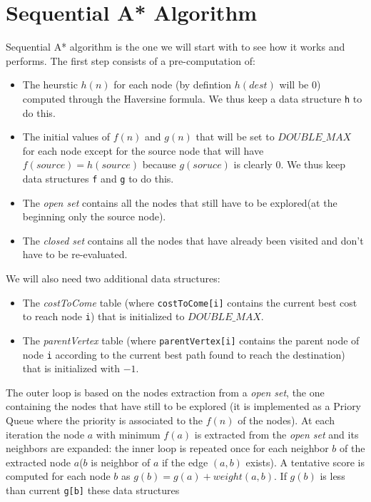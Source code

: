 \documentclass[twocolumn, switch]{article} %
\begin{document}
\section{Sequential A* Algorithm}
Sequential A* algorithm is the one we will start with to see how it works and performs.
The first step consists of a pre-computation of:
\begin{itemize}
  \item The heurstic $h(n)$ for each node (by defintion $h(dest)$ will
        be 0) computed through the Haversine formula. We thus keep a data
        structure \texttt{h} to do this.
  \item The initial values of $f(n)$ and $g(n)$ that will be set to $DOUBLE\_MAX$ for each
        node except for the source node that will have $f(source) = h(source)$ because 
        $g(soruce)$ is clearly $0$. We thus keep data structures \texttt{f} and \texttt{g} to do this.
  \item The \textit{open set} contains all the nodes that still have to be explored(at
        the beginning only the source node).
  \item The \textit{closed set} contains all the nodes that have already been visited and don't
        have to be re-evaluated.
\end{itemize}
We will also need two additional data structures:
\begin{itemize}
  \item The \textit{costToCome} table (where \texttt{costToCome[i]} contains the current
        best cost to reach node \texttt{i}) that is initialized
        to $DOUBLE\_MAX$.
  \item The \textit{parentVertex} table (where \texttt{parentVertex[i]} contains the
        parent node of node \texttt{i} according to the current best path found to reach
        the destination) that is initialized with $-1$.
\end{itemize}
The outer loop is based on the nodes extraction from a \textit{open set}, the one containing
the nodes that have still to be explored (it is implemented as a Priory Queue where the priority
is associated to the $f(n)$ of the nodes). At each iteration the node $a$ with minimum $f(a)$ is
extracted from the \textit{open set} and its neighbors are expanded: the inner loop is repeated once for each neighbor $b$ of the
extracted node $a$($b$ is neighbor of $a$ if the edge $(a, b)$ exists). A tentative score is computed
for each node $b$ as $g(b) = g(a) + weight(a, b)$. If $g(b)$ is less than current \texttt{g[b]} these data structures
\end{document}
